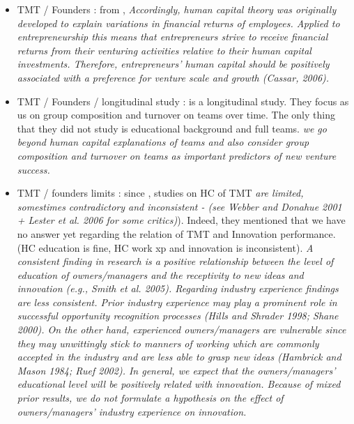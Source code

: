 \begin{itemize}
  \item TMT / Founders : from \citep{unger2011human}, \textit{Accordingly, human capital theory was originally developed to explain variations in financial returns of employees. Applied to entrepreneurship this means that entrepreneurs strive to receive financial returns from their venturing activities relative to their human capital investments. Therefore, entrepreneurs' human capital should be positively associated with a preference for venture scale and growth (Cassar, 2006).}\\

  \item TMT / Founders / longitudinal study : \citep{beckman2007early} is a longitudinal study. They focus as us on group composition and turnover on teams over time. The only thing that they did not study is educational background and full teams. \textit{we go beyond human capital explanations of teams and also consider group composition and turnover on teams as important predictors of new venture success.}

  \item TMT / founders limits : since \citep{de2010interrelationships}, studies on HC of TMT \textit{are limited, somestimes contradictory and inconsistent - (see Webber and Donahue 2001 + Lester et al. 2006 for some critics)}). Indeed, they mentioned that we have no answer yet regarding the relation of TMT and Innovation performance. (HC education is fine, HC work xp and innovation is inconsistent). \textit{A consistent finding in research is a positive relationship between the level of education of owners/managers and the receptivity to new ideas and innovation (e.g., Smith et al. 2005). Regarding industry experience findings are less consistent. Prior industry experience may play a prominent role in successful opportunity recognition processes (Hills and Shrader 1998; Shane 2000). On the other hand, experienced owners/managers are vulnerable since they may unwittingly stick to manners of working which are commonly accepted in the industry and are less able to grasp new ideas (Hambrick and Mason 1984; Ruef 2002). In general, we expect that the owners/managers’ educational level will be positively related with innovation. Because of mixed prior results, we do not formulate a hypothesis on the effect of owners/managers’ industry experience on innovation.}\\


\end{itemize}
